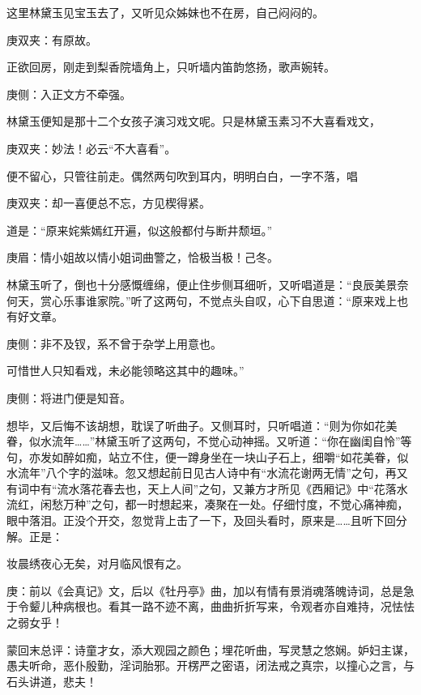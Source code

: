 \begin{parag}
    这里林黛玉见宝玉去了，又听见众姊妹也不在房，自己闷闷的。\begin{note}庚双夹：有原故。\end{note}正欲回房，刚走到梨香院墙角上，只听墙内笛韵悠扬，歌声婉转。\begin{note}庚侧：入正文方不牵强。\end{note}林黛玉便知是那十二个女孩子演习戏文呢。只是林黛玉素习不大喜看戏文，\begin{note}庚双夹：妙法！必云“不大喜看”。\end{note}便不留心，只管往前走。偶然两句吹到耳内，明明白白，一字不落，唱\begin{note}庚双夹：却一喜便总不忘，方见楔得紧。\end{note}道是：“原来姹紫嫣红开遍，似这般都付与断井颓垣。”\begin{note}庚眉：情小姐故以情小姐词曲警之，恰极当极！己冬。\end{note}林黛玉听了，倒也十分感慨缠绵，便止住步侧耳细听，又听唱道是：“良辰美景奈何天，赏心乐事谁家院。”听了这两句，不觉点头自叹，心下自思道：“原来戏上也有好文章。\begin{note}庚侧：非不及钗，系不曾于杂学上用意也。\end{note}可惜世人只知看戏，未必能领略这其中的趣味。”\begin{note}庚侧：将进门便是知音。\end{note}想毕，又后悔不该胡想，耽误了听曲子。又侧耳时，只听唱道：“则为你如花美眷，似水流年……”林黛玉听了这两句，不觉心动神摇。又听道：“你在幽闺自怜”等句，亦发如醉如痴，站立不住，便一蹲身坐在一块山子石上，细嚼“如花美眷，似水流年”八个字的滋味。忽又想起前日见古人诗中有“水流花谢两无情”之句，再又有词中有“流水落花春去也，天上人间”之句，又兼方才所见《西厢记》中“花落水流红，闲愁万种”之句，都一时想起来，凑聚在一处。仔细忖度，不觉心痛神痴，眼中落泪。正没个开交，忽觉背上击了一下，及回头看时，原来是……且听下回分解。正是：
\end{parag}


\begin{poem}
    \begin{pl}妆晨绣夜心无矣，对月临风恨有之。\end{pl}
\end{poem}


\begin{parag}
    \begin{note}庚：前以《会真记》文，后以《牡丹亭》曲，加以有情有景消魂落魄诗词，总是急于令颦儿种病根也。看其一路不迹不离，曲曲折折写来，令观者亦自难持，况怯怯之弱女乎！\end{note}
\end{parag}


\begin{parag}
    \begin{note}蒙回末总评：诗童才女，添大观园之颜色；埋花听曲，写灵慧之悠娴。妒妇主谋，愚夫听命，恶仆殷勤，淫词胎邪。开楞严之密语，闭法戒之真宗，以撞心之言，与石头讲道，悲夫！\end{note}
\end{parag}